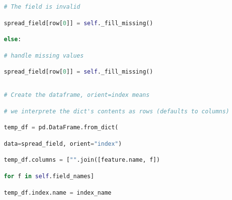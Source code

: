 \documentclass[
  11pt,
  a4paper,
  DIV=12,captions=tableheading,oneside]{scrbook}
\begin{document}
\begin{lstlisting}[language=Python,stepnumber=2,basicstyle=\footnotesize]
                    # The field is invalid\end{lstlisting}
\begin{lstlisting}[language=Python,stepnumber=2,basicstyle=\footnotesize]
                    spread_field[row[0]] = self._fill_missing()\end{lstlisting}
\begin{lstlisting}[language=Python,stepnumber=2,basicstyle=\footnotesize]
            else:\end{lstlisting}
\begin{lstlisting}[language=Python,stepnumber=2,basicstyle=\footnotesize]
                # handle missing values\end{lstlisting}
\begin{lstlisting}[language=Python,stepnumber=2,basicstyle=\footnotesize]
                spread_field[row[0]] = self._fill_missing()\end{lstlisting}
\begin{lstlisting}[language=Python,stepnumber=2,basicstyle=\footnotesize]
\end{lstlisting}
\begin{lstlisting}[language=Python,stepnumber=2,basicstyle=\footnotesize]
        # Create the dataframe, orient=index means\end{lstlisting}
\begin{lstlisting}[language=Python,stepnumber=2,basicstyle=\footnotesize]
        # we interprete the dict's contents as rows (defaults to columns)\end{lstlisting}
\begin{lstlisting}[language=Python,stepnumber=2,basicstyle=\footnotesize]
        temp_df = pd.DataFrame.from_dict(\end{lstlisting}
\begin{lstlisting}[language=Python,stepnumber=2,basicstyle=\footnotesize]
            data=spread_field, orient="index")\end{lstlisting}
\begin{lstlisting}[language=Python,stepnumber=2,basicstyle=\footnotesize]
        temp_df.columns = ["".join([feature.name, f])\end{lstlisting}
\begin{lstlisting}[language=Python,stepnumber=2,basicstyle=\footnotesize]
                           for f in self.field_names]\end{lstlisting}
\begin{lstlisting}[language=Python,stepnumber=2,basicstyle=\footnotesize]
        temp_df.index.name = index_name\end{lstlisting}
\end{document}
